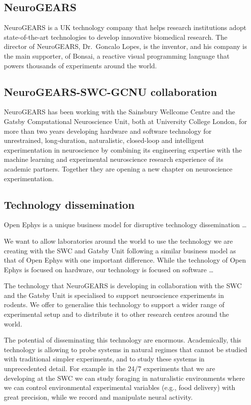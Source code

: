 \subsection{NeuroGEARS}

NeuroGEARS is a UK technology company that helps research institutions adopt
state-of-the-art technologies to develop innovative biomedical research.  The
director of NeuroGEARS, Dr.~Goncalo Lopes, is the inventor, and his company is
the main supporter, of Bonsai, a reactive visual programming language that
powers thousands of experiments around the world.

\subsection{NeuroGEARS-SWC-GCNU collaboration}

NeuroGEARS has been working with the Sainsbury Wellcome Centre and the Gatsby
Computational Neuroscience Unit, both at University College London, for more
than two years developing hardware and software technology for unrestrained,
long-duration, naturalistic, closed-loop and intelligent experimentation in
neuroscience by combining its engineering expertise with the machine learning
and experimental neuroscience research experience of its academic partners.
Together they are opening a new chapter on neuroscience experimentation.

\subsection{Technology dissemination}

Open Ephys is a unique business model for disruptive technology dissemination
\ldots

We want to allow laboratories around the world to use the technology we are
creating with the SWC and Gatsby Unit following a similar business model as
that of Open Ephys with one important difference. While the technology of Open
Ephys is focused on hardware, our technology is focused on software \ldots

The technology that NeuroGEARS is developing in collaboration with the SWC and
the Gatsby Unit is specialised to support neuroscience experiments in rodents.
We offer to generalise this technology to support a wider range of experimental
setup and to distribute it to other research centres around
the world.

The potential of disseminating this technology are enormous. Academically,
this technology is allowing to probe systems in natural regimes that cannot
be studied with traditional simpler experiments, and to study these systems in
unprecedented detail. For example in the 24/7 experiments that we
are developing at the SWC we can study foraging in naturalistic environments
where we can control environmental experimental variables (e.g., food delivery)
with great precision, while we record and manipulate neural activity.

